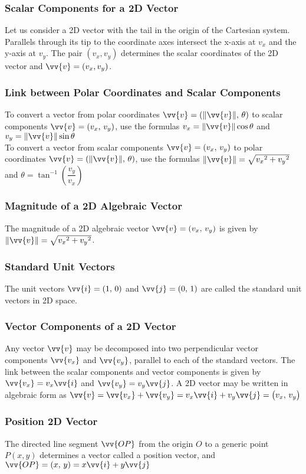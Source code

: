 \documentclass{article}
\begin{document}
	\subsubsection{Scalar Components for a 2D Vector}
	Let us consider a 2D vector with the tail in the origin of the Cartesian system. Parallels through its tip to the coordinate axes intersect the x-axis at $v_x$ and the y-axis at $v_y$.
	The pair $(v_x, v_y)$ determines the scalar coordinates of the 2D vector and $\vv{v}=(v_x, v_y)$.
	\subsubsection{Link between Polar Coordinates and Scalar Components}
	To convert a vector from polar coordinates $\vv{v}=(\lVert\vv{v}\rVert,\,\theta)$ to scalar components $\vv{v}=(v_x,\,v_y)$, use the formulas $v_x=\lVert\vv{v}\rVert\cos\theta$ and $v_y=\lVert\vv{v}\rVert\sin\theta$\\
	To convert a vector from scalar components $\vv{v}=(v_x,\,v_y)$ to polar coordinates $\vv{v}=(\lVert\vv{v}\rVert,\,\theta)$, use the formulas $\lVert\vv{v}\rVert=\sqrt{{v_x}^2+{v_y}^2}$ and $\theta=\tan^{-1}\left(\dfrac{v_y}{v_x}\right)$
	\subsubsection{Magnitude of a 2D Algebraic Vector}
	The magnitude of a 2D algebraic vector $\vv{v}=(v_x,\,v_y)$ is given by $\lVert\vv{v}\rVert=\sqrt{{v_x}^2+{v_y}^2}$.
	\subsubsection{Standard Unit Vectors}
	The unit vectors $\vv{i}=(1,\,0)$ and $\vv{j}=(0,\,1)$ are called the standard unit vectors in 2D space.
	\subsubsection{Vector Components of a 2D Vector}
	Any vector $\vv{v}$ may be decomposed into two perpendicular vector components $\vv{v_x}$ and $\vv{v_y}$, parallel to each of the standard vectors. %
	The link between the scalar components and vector components is given by $\vv{v_x}=v_x\vv{i}$ and $\vv{v_y}=v_y\vv{j}$. A 2D vector may be written in algebraic form as $\vv{v}=\vv{v_x}+\vv{v_y}=v_x\vv{i}+v_y\vv{j}=\left(v_x,\,v_y\right)$
	\subsubsection{Position 2D Vector}
	The directed line segment $\vv{OP}$ from the origin $O$ to a generic point $P(x, y)$ determines a vector called a position vector, and $\vv{OP}=(x,\,y)=x\vv{i}+y\vv{j}$
\end{document}
